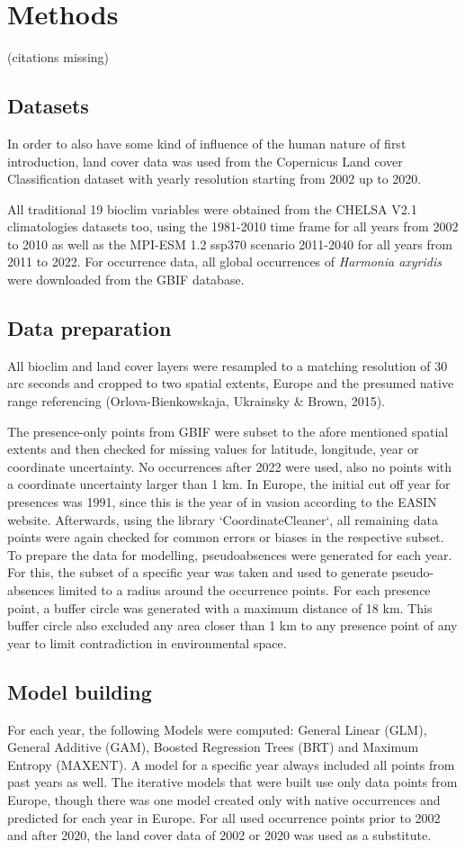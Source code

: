 \documentclass[12pt,a4paper]{article}
\begin{document}
\newpage
\section{Methods}
(citations missing)
\subsection{Datasets}
In order to also have some kind of influence of the human nature of first introduction, land cover data was used from the Copernicus Land cover Classification dataset with yearly resolution starting from 2002 up to 2020.

All traditional 19 bioclim variables were obtained from the CHELSA V2.1 climatologies datasets too, using the 1981-2010 time frame for all years from 2002 to 2010 as well as the MPI-ESM 1.2 ssp370 scenario 2011-2040 for all years from 2011 to 2022. 
For occurrence data, all global occurrences of \textit{Harmonia axyridis} were downloaded from the GBIF database.

\subsection{Data preparation}
All bioclim and land cover layers were resampled to a matching resolution of 30 arc seconds and cropped to two spatial extents, Europe and the presumed native range referencing (Orlova-Bienkowskaja, Ukrainsky \& Brown, 2015).

The presence-only points from GBIF were subset to the afore mentioned spatial extents and then checked for missing values for latitude, longitude, year or coordinate uncertainty. 
No occurrences after 2022 were used, also no points with a coordinate uncertainty larger than 1 km. 
In Europe, the initial cut off year for presences was 1991, since this is the year of in vasion according to the EASIN website.
Afterwards, using the library `CoordinateCleaner`, all remaining data points were again checked for common errors or biases in the respective subset.
To prepare the data for modelling, pseudoabsences were generated for each year. 
For this, the subset of a specific year was taken and used to generate pseudo-absences limited to a radius around the occurrence points.
For each presence point, a buffer circle was generated with a maximum distance of 18 km. This buffer circle also excluded any area closer than 1 km to any presence point of any year to limit contradiction in environmental space.

\subsection{Model building}
For each year, the following Models were computed: General Linear (GLM), General Additive (GAM), Boosted Regression Trees (BRT) and Maximum Entropy (MAXENT).  
A model for a specific year always included all points from past years as well.
The iterative models that were built use only data points from Europe, though there was one model created only with native occurrences and predicted for each year in Europe.
For all used occurrence points prior to 2002 and after 2020, the land cover data of 2002 or 2020 was used as a substitute.
\end{document}

